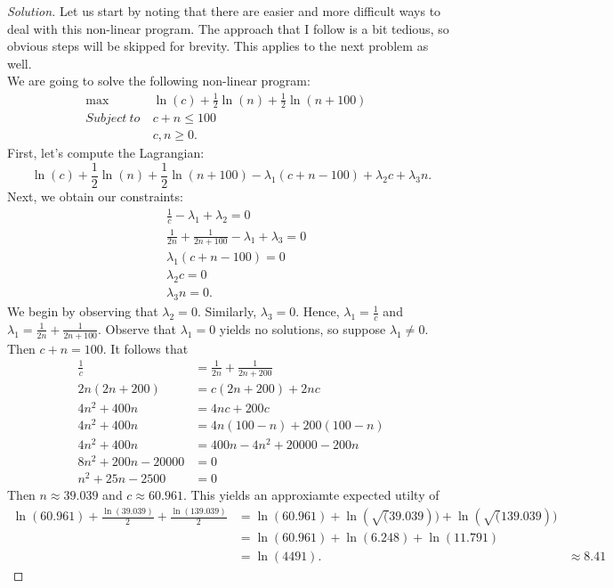 \documentclass[12pt]{article}
\theoremstyle{definition}
\theoremstyle{remark}
\begin{document}
\begin{proof}[Solution]
  Let us start by noting that there are easier and more difficult ways to deal with this non-linear program. The approach that I follow is a bit tedious, so obvious steps will be skipped for brevity. This applies to the next problem as well. \\
  We are going to solve the following non-linear program:
  \begin{align*}
    \max &\ln(c) + \frac{1}{2}\ln(n) + \frac{1}{2}\ln(n + 100) &\\
    Subject \ to \ &c + n \leq 100 & \\
    & c, n \geq 0. &
  \end{align*}
  First, let's compute the Lagrangian:
  $$\ln(c) + \frac{1}{2}\ln(n) + \frac{1}{2}\ln(n + 100) - \lambda_1(c + n - 100) + \lambda_2c + \lambda_3n.$$
  Next, we obtain our constraints:
  \begin{align*}
    &\frac{1}{c} - \lambda_1 + \lambda_2 = 0\\
    &\frac{1}{2n} + \frac{1}{2n + 100} - \lambda_1 + \lambda_3 = 0 \\
    &\lambda_1(c + n - 100) = 0 \\
    &\lambda_2c = 0 \\
    &\lambda_3n = 0.
  \end{align*}
  We begin by observing that $\lambda_2 = 0$. Similarly, $\lambda_3 = 0$. Hence, $\lambda_1 = \frac{1}{c}$ and $\lambda_1 = \frac{1}{2n} + \frac{1}{2n + 100}$. Observe that $\lambda_1 = 0$ yields no solutions, so suppose $\lambda_1 \neq 0$. Then $c + n = 100$. It follows that
  \begin{align*}
    \frac{1}{c} &= \frac{1}{2n} + \frac{1}{2n + 200} \\
    2n(2n + 200) &= c(2n + 200) + 2nc \\
    4n^2 + 400n &= 4nc + 200c\\
    4n^2 + 400n &= 4n(100 - n) + 200(100 - n)\\
    4n^2 + 400n &= 400n - 4n^2 + 20000 - 200n\\
    8n^2 + 200n - 20000 &= 0\\
    n^2 + 25n - 2500 &= 0
  \end{align*}
  Then $n \approx 39.039$ and $c \approx 60.961$. This yields an approxiamte expected utilty of
  \begin{align*}
    \ln(60.961) + \frac{\ln(39.039)}{2} + \frac{\ln(139.039)}{2} &= \ln(60.961) + \ln(\sqrt(39.039)) + \ln(\sqrt(139.039)) \\
    &= \ln(60.961) + \ln(6.248) + \ln(11.791) \\
    &= \ln(4491).
    &\approx 8.41
  \end{align*}
\end{proof}
\end{document}
